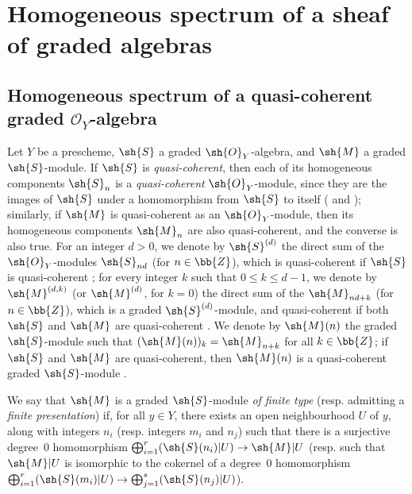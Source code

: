 \section{Homogeneous spectrum of a sheaf of graded algebras}
\label{section:II.3}


\subsection{Homogeneous spectrum of a quasi-coherent graded $\mathcal{O}_Y$-algebra}
\label{subsection:II.3.1}
\label{II.3.1}

\begin{env}[3.1.1]
\label{II.3.1.1}
Let $Y$ be a prescheme, $\sh{S}$ a graded $\sh{O}_Y$-algebra, and $\sh{M}$ a graded $\sh{S}$-module.
If $\sh{S}$ is \emph{quasi-coherent}, then each of its homogeneous components $\sh{S}_n$ is a \emph{quasi-coherent} $\sh{O}_Y$-module, since they are the images of $\sh{S}$ under a homomorphism from $\sh{S}$ to itself ( and );
similarly, if $\sh{M}$ is quasi-coherent as an $\sh{O}_Y$-module, then its homogeneous components $\sh{M}_n$ are also quasi-coherent, and the converse is also true.
For an integer $d>0$, we denote by $\sh{S}^{(d)}$ the direct sum of the $\sh{O}_Y$-modules $\sh{S}_{nd}$ (for $n\in\bb{Z}$), which is quasi-coherent if $\sh{S}$ is quasi-coherent ;
for every integer $k$ such that $0\leq k\leq d-1$, we denote by $\sh{M}^{(d,k)}$ (or $\sh{M}^{(d)}$, for $k=0$) the direct sum of the $\sh{M}_{nd+k}$ (for $n\in\bb{Z}$), which is a graded $\sh{S}^{(d)}$-module, and quasi-coherent if both $\sh{S}$ and $\sh{M}$ are quasi-coherent .
We denote by $\sh{M}(n)$ the graded $\sh{S}$-module such that $(\sh{M}(n))_k=\sh{M}_{n+k}$ for all $k\in\bb{Z}$;
if $\sh{S}$ and $\sh{M}$ are quasi-coherent, then $\sh{M}(n)$ is a quasi-coherent graded $\sh{S}$-module .

We say that $\sh{M}$ is a graded $\sh{S}$-module \emph{of finite type} (resp. admitting a \emph{finite presentation})  if, for all $y\in Y$, there exists an open neighbourhood $U$ of $y$, along with integers $n_i$ (resp. integers $m_i$ and $n_j$) such that there is a surjective degree~$0$ homomorphism $\bigoplus_{i=1}^r(\sh{S}(n_i)|U)\to\sh{M}|U$ (resp. such that $\sh{M}|U$ is isomorphic to the cokernel of a degree~$0$ homomorphism $\bigoplus_{i=1}^r(\sh{S}(m_i)|U)\to\bigoplus_{j=1}^s(\sh{S}(n_j)|U)$).


\end{env}
